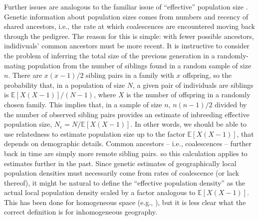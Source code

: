 \documentclass{ar-1col}
\newcommand{\plr}[1]{{\color{green}{#1}}}
\newcommand{\E}{\mathbb{E}}
\begin{document}
Further issues are analogous to the familiar
issue of ``effective'' population size \citep{CharlesworthCharlesworthBarton2003}.
Genetic information about population sizes
comes from numbers and recency of shared ancestors, 
i.e., the rate at which coalescences are encountered moving back through the pedigree.
The reason for this is simple:
with fewer possible ancestors,
indidivuals' common ancestors must be more recent.
It is instructive to consider 
the problem of inferring the total size of the previous generation
in a randomly-mating population
from the number of siblings found in a random sample of size $n$.
\plr{(adjust the below to talk about chromosomes rather than diploids?)}
There are $x (x-1) / 2$ sibling pairs in a family with $x$ offspring,
so the probability that, 
in a population of size $N$, 
a given pair of individuals are siblings
is $\E[X (X-1)] / (N-1)$, where $X$ is the number of offspring in a randomly chosen family.
This implies that, 
in a sample of size $n$,
$n(n-1)/2$ divided by the number of observed sibling pairs 
provides an estimate of inbreeding effective population size, $N_e = N/\E[X(X-1)]$.
In other words, we should be able to use relatedness to estimate population size
up to the factor $\E[X(X-1)]$, that depends on demographic details.
Common ancestors -- i.e., coalescences --
further back in time are simply more remote sibling pairs.
so this calculation applies to estimates further in the past.
Since genetic estimates of geographically local population densities
must necessarily come from rates of coalescence (or lack thereof),
it might be natural to define the ``effective population density''
as the actual local population density scaled by a factor analogous to $\E[X(X-1)]$.
This has been done for homogeneous space (e.g., \citep{barton-depaulis-etheridge}),
but it is less clear what the correct definition is for inhomogeneous geography.
\end{document}
